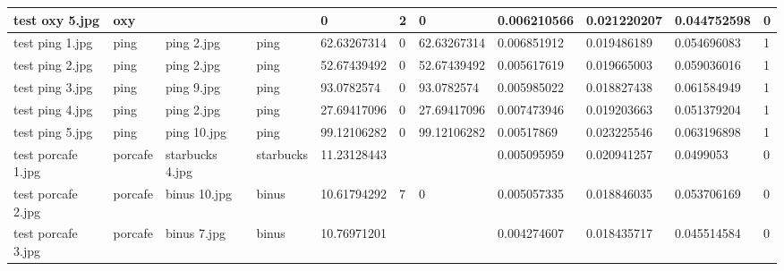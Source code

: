 \begin{landscape}
\begin{longtable}{|p{2cm}|p{1.5cm}|p{2cm}|p{1.5cm}|p{2cm}|p{1cm}|p{2cm}|p{2cm}|p{2cm}|p{2cm}|p{1cm}|}
		test oxy 5.jpg       & oxy              &                       &                             & 0                     & 2                       & 0                          & 0.006210566           & 0.021220207           & 0.044752598              & 0                \\ \hline
		test ping 1.jpg      & ping             & ping 2.jpg            & ping                        & 62.63267314           & 0                       & 62.63267314                & 0.006851912           & 0.019486189           & 0.054696083              & 1                \\ \hline
		test ping 2.jpg      & ping             & ping 2.jpg            & ping                        & 52.67439492           & 0                       & 52.67439492                & 0.005617619           & 0.019665003           & 0.059036016              & 1                \\ \hline
		test ping 3.jpg      & ping             & ping 9.jpg            & ping                        & 93.0782574            & 0                       & 93.0782574                 & 0.005985022           & 0.018827438           & 0.061584949              & 1                \\ \hline
		test ping 4.jpg      & ping             & ping 2.jpg            & ping                        & 27.69417096           & 0                       & 27.69417096                & 0.007473946           & 0.019203663           & 0.051379204              & 1                \\ \hline
		test ping 5.jpg      & ping             & ping 10.jpg           & ping                        & 99.12106282           & 0                       & 99.12106282                & 0.00517869            & 0.023225546           & 0.063196898              & 1                \\ \hline
		test porcafe 1.jpg   & porcafe          & starbucks 4.jpg       & starbucks                   & 11.23128443           &                         &                            & 0.005095959           & 0.020941257           & 0.0499053                & 0                \\ \hline
		test porcafe 2.jpg   & porcafe          & binus 10.jpg          & binus                       & 10.61794292           & 7                       & 0                          & 0.005057335           & 0.018846035           & 0.053706169              & 0                \\ \hline
		test porcafe 3.jpg   & porcafe          & binus 7.jpg           & binus                       & 10.76971201           &                         &                            & 0.004274607           & 0.018435717           & 0.045514584              & 0                \\ \hline

\end{longtable}
\end{landscape}

